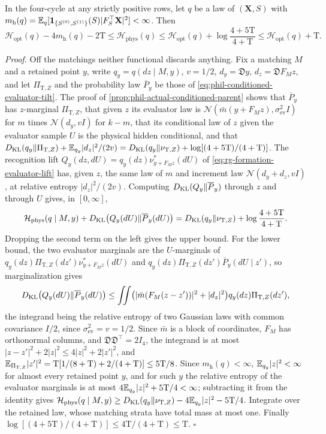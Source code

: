 In the four-cycle at any strictly positive rows, let \(q\) be a law of
\((\mathbf X,S)\) with
\(m_{\mathrm h}(q)=\mathbb E_q[\mathbf 1_{\{S^{(0)},S^{(1)}\}}(S)|F_S^\top\mathbf X|^2]<\infty\).
Then
\[
 \mathcal H_{\mathrm{opt}}(q)-4m_{\mathrm h}(q)-2\mathrm T
 \le\mathcal H_{\mathrm{phys}}(q)
 \le\mathcal H_{\mathrm{opt}}(q)+\log\frac{4+5\mathrm T}{4+\mathrm T}
 \le\mathcal H_{\mathrm{opt}}(q)+\mathrm T.
\]

\noindent\emph{Proof.}
Off the matchings neither functional discards anything. Fix a matching \(M\)
and a retained point \(y\), write \(q_y=q(dz\mid M,y)\), \(v=1/2\),
\(d_y=\mathfrak Dy\), \(d_z=\mathfrak DF_Mz\), and let
\(\Pi_{\mathrm T,Z}\) and the probability law \(\overline P_y\) be those of
\cref{eq:phil-conditioned-evaluator-tilt}. The proof of
\cref{prop:phil-actual-conditioned-parent} shows that \(\overline P_y\) has
\(z\)-marginal \(\Pi_{\mathrm T,Z}\), that given \(z\) its evaluator law is
\(\mathcal N(\bar m(y+F_Mz),\sigma^2_{\mathrm{ev}}I)\) for \(m\) times
\(\mathcal N(d_y,vI)\) for \(k-m\), that its conditional law of \(z\) given the evaluator sample \(U\) is
the physical hidden conditional, and that
\(D_{\mathrm{KL}}(q_y\Vert\Pi_{\mathrm T,Z})+\mathbb E_{q_y}|d_z|^2/(2v)
=D_{\mathrm{KL}}(q_y\Vert\nu_{\mathrm T,Z})+\log[(4+5\mathrm T)/(4+\mathrm T)]\). The
recognition lift \(Q_y(dz,dU)=q_y(dz)\nu^*_{y+F_Mz}(dU)\) of
\cref{eq:rg-formation-evaluator-lift} has, given \(z\), the same law of \(m\)
and increment law \(\mathcal N(d_y+d_z,vI)\), at relative entropy
\(|d_z|^2/(2v)\). Computing \(D_{\mathrm{KL}}(Q_y\Vert\overline P_y)\) through \(z\) and
through \(U\) gives, in \([0,\infty]\),
\[
 \mathcal H_{\mathrm{phys}}(q\mid M,y)
 +D_{\mathrm{KL}}\bigl(Q_y(dU)\Vert\overline P_y(dU)\bigr)
 =D_{\mathrm{KL}}(q_y\Vert\nu_{\mathrm T,Z})+\log\frac{4+5\mathrm T}{4+\mathrm T}.
\]
Dropping the second term on the left gives the upper bound. For the lower
bound, the two
evaluator marginals are the \(U\)-marginals of
\(q_y(dz)\Pi_{\mathrm T,Z}(dz')\nu^*_{y+F_Mz}(dU)\) and
\(q_y(dz)\Pi_{\mathrm T,Z}(dz')\overline P_y(dU\mid z')\), so marginalization
gives
\[
 D_{\mathrm{KL}}\bigl(Q_y(dU)\Vert\overline P_y(dU)\bigr)
 \le\iint\bigl(|\bar m(F_M(z-z'))|^2+|d_z|^2\bigr)
     q_y(dz)\Pi_{\mathrm T,Z}(dz'),
\]
the integrand being the relative entropy of two Gaussian laws with common
covariance \(I/2\), since \(\sigma^2_{\mathrm{ev}}=v=1/2\). Since \(\bar m\) is a block of coordinates, \(F_M\) has
orthonormal columns, and \(\mathfrak D\mathfrak D^\top=2I_4\), the integrand
is at most \(|z-z'|^2+2|z|^2\le4|z|^2+2|z'|^2\), and
\(\mathbb E_{\Pi_{\mathrm T,Z}}|z'|^2=\mathrm T[1/(8+\mathrm T)+2/(4+\mathrm T)]\le5\mathrm T/8\).
Since \(m_{\mathrm h}(q)<\infty\), \(\mathbb E_{q_y}|z|^2<\infty\) for almost every
retained point \(y\), and for such \(y\) the relative entropy of the
evaluator marginals is at most \(4\mathbb E_{q_y}|z|^2+5\mathrm T/4<\infty\);
subtracting it from the identity
gives
\(\mathcal H_{\mathrm{phys}}(q\mid M,y)\ge D_{\mathrm{KL}}(q_y\Vert\nu_{\mathrm T,Z})
-4\mathbb E_{q_y}|z|^2-5\mathrm T/4\). Integrate over the retained law, whose
matching strata have total mass at most one. Finally
\(\log[(4+5\mathrm T)/(4+\mathrm T)]\le4\mathrm T/(4+\mathrm T)\le\mathrm T\).
\(\square\)

